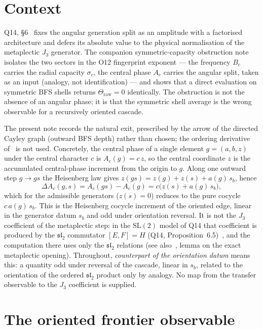\documentclass[11pt]{article}
\begin{document}
  \section{Context}

    Q14, \S6~\cite{Beau2026q14} fixes the angular generation split as an amplitude with a factorised
    architecture and defers its absolute value to the physical normalisation of the metaplectic $J_3$
    generator.
    The companion symmetric-capacity obstruction note isolates the two sectors in the O12 fingerprint
    exponent --- the frequency $B_c$ carries the radial capacity $\sigma_c$, the central phase $A_c$ carries
    the angular split, taken as an input (analogy, not identification) --- and shows that a direct evaluation on symmetric BFS shells returns
    $\Theta_{\mathrm{raw}}=0$ identically.
    The obstruction is not the absence of an angular phase; it is that the symmetric shell average is the
    wrong observable for a recursively oriented cascade.

    The present note records the natural exit, prescribed by the arrow of the directed Cayley graph (outward
    BFS depth) rather than chosen; the ordering derivative of~\cite{Beau2026q11} is not used.
    Concretely, the central phase of a single element $g=(a,b,z)$ under the central character $c$ is
    $A_c(g)=c\,z$, so the central coordinate $z$ is the accumulated central-phase increment from the origin to
    $g$.
    Along one outward step $g\to gs$ the Heisenberg law gives $z(gs)=z(g)+z(s)+a(g)\,s_b$, hence
    \[
      \Delta A_c(g,s) = A_c(gs)-A_c(g) = c\big(z(s)+a(g)\,s_b\big),
    \]
    which for the admissible generators ($z(s)=0$) reduces to the pure cocycle $c\,a(g)\,s_b$.
    This is the Heisenberg cocycle increment of the oriented edge, linear in the generator datum $s_b$ and
    odd under orientation reversal.
    It is not the $J_3$ coefficient of the metaplectic step: in the $\mathrm{SL}(2)$ model of Q14 that
    coefficient is produced by the $\mathfrak{sl}_2$ commutator $[E,F]=H$ (Q14,
    Proposition~6.5)~\cite{Beau2026q14}, and the computation there uses only the $\mathfrak{sl}_2$ relations
    (see also~\cite{Beau2026prs}, lemma on the exact metaplectic opening).
    Throughout, \emph{counterpart of the orientation datum} means this: a quantity odd under reversal of the
    cascade, linear in $s_b$, related to the orientation of the ordered $\mathfrak{sl}_2$ product only by
    analogy.
    No map from the transfer observable to the $J_3$ coefficient is supplied.

  \section{The oriented frontier observable}
\end{document}
